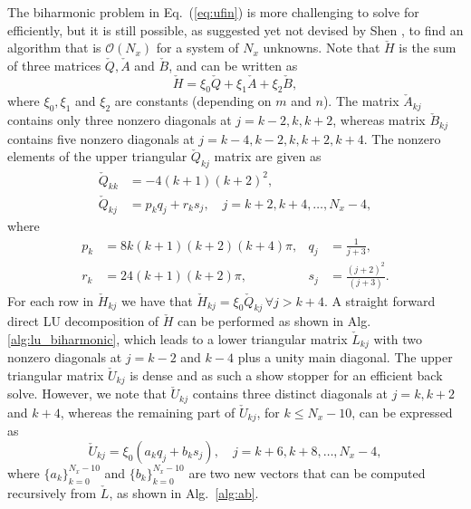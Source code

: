 \documentclass[preprint]{elsarticle}
\newcommand{\N}[1]{\check{#1}}
\begin{document}
The biharmonic problem in Eq.~(\ref{eq:ufin}) is more challenging to solve for efficiently, but 
it is still possible, as suggested yet not devised by Shen \cite{Shen95}, to find an algorithm that is $\mathcal{O}(N_x)$ for a system of $N_x$ unknowns. Note 
that $\N{H}$ is the sum of three matrices $\N{Q}, \N{A}$ and $\N{B}$, and can be 
written as
\begin{equation}
\N{H} = \xi_0\N{Q} + \xi_1\N{A} + \xi_2 \N{B},
\end{equation}
where $\xi_0, \xi_1$ and $\xi_2$ are constants (depending on $m$ and $n$). The matrix $\N{A}_{kj}$ contains only 
three nonzero diagonals at $ j = k-2, k, k+2$,  whereas matrix $\N{B}_{kj}$ 
contains five 
nonzero diagonals at $ j = k-4, k-2, k, k+2, k+4$. The nonzero elements of the 
upper triangular $\N{Q}_{kj}$ matrix are given as \cite{Shen95}
\begin{align}
\label{eq:N_Q}
 \N{Q}_{kk} &= -4(k+1)(k+2)^2, \\
 \N{Q}_{kj} &= p_kq_j + r_ks_j, \quad j = k+2, k+4, \ldots, N_x-4,
\end{align}
where 
\begin{align}
p_k &= 8 k (k+1)(k+2)(k+4)\pi, &q_j &= \frac{1}{j+3}, \label{eq:pk} \\
r_k &= 24(k+1)(k+2)\pi, &s_j &=  \frac{(j+2)^2}{(j+3)}. \label{eq:rk}
\end{align} 
For each row in $\N{H}_{kj}$ we have that $\N{H}_{kj}=\xi_0\N{Q}_{kj}\, \forall j 
> k+4$. A straight forward direct LU decomposition of $\N{H}$ can be performed 
as shown in Alg. 
\ref{alg:lu_biharmonic}, which leads to a lower 
triangular 
matrix $\N{L}_{kj}$ with two nonzero diagonals at $j=k-2$ and $k-4$ plus a 
unity 
main diagonal. The upper triangular matrix $\N{U}_{kj}$ is dense and as such a 
show stopper for an efficient back solve. However, we note that $\N{U}_{kj}$ 
contains three distinct 
diagonals at $j=k, k+2$ and $k+4$, whereas the remaining part of $\N{U}_{kj}$, for $k\le N_x-10$, 
can be expressed as
\begin{equation}
\N{U}_{kj} = \xi_0(a_k q_j + b_k s_j), \quad j = k+6, k+8, \ldots, N_x-4, 
\label{eq:ab}
\end{equation}
where $\{a_k\}_{k=0}^{N_x-10}$ and $\{b_k\}_{k=0}^{N_x-10}$ are two new 
vectors that can be computed recursively from $\N{L}$, as shown in Alg.~\ref{alg:ab}. 
\end{document}
